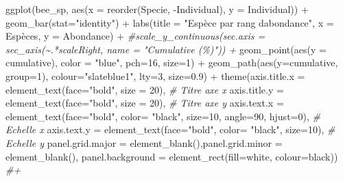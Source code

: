 \documentclass[
]{article}
\newenvironment{Shaded}{\begin{snugshade}}{\end{snugshade}}
\newcommand{\AttributeTok}[1]{\textcolor[rgb]{0.77,0.63,0.00}{#1}}
\newcommand{\CommentTok}[1]{\textcolor[rgb]{0.56,0.35,0.01}{\textit{#1}}}
\newcommand{\DecValTok}[1]{\textcolor[rgb]{0.00,0.00,0.81}{#1}}
\newcommand{\FloatTok}[1]{\textcolor[rgb]{0.00,0.00,0.81}{#1}}
\newcommand{\FunctionTok}[1]{\textcolor[rgb]{0.00,0.00,0.00}{#1}}
\newcommand{\NormalTok}[1]{#1}
\newcommand{\SpecialCharTok}[1]{\textcolor[rgb]{0.00,0.00,0.00}{#1}}
\newcommand{\StringTok}[1]{\textcolor[rgb]{0.31,0.60,0.02}{#1}}
\begin{document}
\begin{Shaded}
\begin{Highlighting}[]
\FunctionTok{ggplot}\NormalTok{(bee\_sp, }\FunctionTok{aes}\NormalTok{(}\AttributeTok{x =} \FunctionTok{reorder}\NormalTok{(Specie, }\SpecialCharTok{{-}}\NormalTok{Individual), }\AttributeTok{y =}\NormalTok{  Individual)) }\SpecialCharTok{+} 
  \FunctionTok{geom\_bar}\NormalTok{(}\AttributeTok{stat=}\StringTok{"identity"}\NormalTok{) }\SpecialCharTok{+}
  \FunctionTok{labs}\NormalTok{(}\AttributeTok{title =} \StringTok{"Espèce par rang d\textquotesingle{}abondance"}\NormalTok{, }\AttributeTok{x =} \StringTok{\textquotesingle{}Espèces\textquotesingle{}}\NormalTok{, }\AttributeTok{y =} \StringTok{\textquotesingle{}Abondance\textquotesingle{}}\NormalTok{) }\SpecialCharTok{+}
  \CommentTok{\#scale\_y\_continuous(sec.axis = sec\_axis(\textasciitilde{}.*scaleRight, name = "Cumulative (\%)")) +}
  \FunctionTok{geom\_point}\NormalTok{(}\FunctionTok{aes}\NormalTok{(}\AttributeTok{y =}\NormalTok{ cumulative), }\AttributeTok{color =} \StringTok{"blue"}\NormalTok{, }\AttributeTok{pch=}\DecValTok{16}\NormalTok{, }\AttributeTok{size=}\DecValTok{1}\NormalTok{) }\SpecialCharTok{+} 
  \FunctionTok{geom\_path}\NormalTok{(}\FunctionTok{aes}\NormalTok{(}\AttributeTok{y=}\NormalTok{cumulative, }\AttributeTok{group=}\DecValTok{1}\NormalTok{), }\AttributeTok{colour=}\StringTok{"slateblue1"}\NormalTok{, }\AttributeTok{lty=}\DecValTok{3}\NormalTok{, }\AttributeTok{size=}\FloatTok{0.9}\NormalTok{) }\SpecialCharTok{+}
  \FunctionTok{theme}\NormalTok{(}\AttributeTok{axis.title.x =} \FunctionTok{element\_text}\NormalTok{(}\AttributeTok{face=}\StringTok{"bold"}\NormalTok{, }\AttributeTok{size =} \DecValTok{20}\NormalTok{), }\CommentTok{\# Titre axe x}
        \AttributeTok{axis.title.y =} \FunctionTok{element\_text}\NormalTok{(}\AttributeTok{face=}\StringTok{"bold"}\NormalTok{, }\AttributeTok{size =} \DecValTok{20}\NormalTok{), }\CommentTok{\# Titre axe y}
        \AttributeTok{axis.text.x =} \FunctionTok{element\_text}\NormalTok{(}\AttributeTok{face=}\StringTok{"bold"}\NormalTok{, }\AttributeTok{color=} \StringTok{"black"}\NormalTok{, }\AttributeTok{size=}\DecValTok{10}\NormalTok{, }\AttributeTok{angle=}\DecValTok{90}\NormalTok{, }\AttributeTok{hjust=}\DecValTok{0}\NormalTok{), }\CommentTok{\# Echelle x}
        \AttributeTok{axis.text.y =} \FunctionTok{element\_text}\NormalTok{(}\AttributeTok{face=}\StringTok{"bold"}\NormalTok{, }\AttributeTok{color=} \StringTok{"black"}\NormalTok{, }\AttributeTok{size=}\DecValTok{10}\NormalTok{), }\CommentTok{\# Echelle y}
        \AttributeTok{panel.grid.major =} \FunctionTok{element\_blank}\NormalTok{(),}\AttributeTok{panel.grid.minor =} \FunctionTok{element\_blank}\NormalTok{(),}
        \AttributeTok{panel.background =} \FunctionTok{element\_rect}\NormalTok{(}\AttributeTok{fill=}\StringTok{\textquotesingle{}white\textquotesingle{}}\NormalTok{, }\AttributeTok{colour=}\StringTok{\textquotesingle{}black\textquotesingle{}}\NormalTok{)) }\CommentTok{\#+}
\end{Highlighting}
\end{Shaded}
\end{document}
